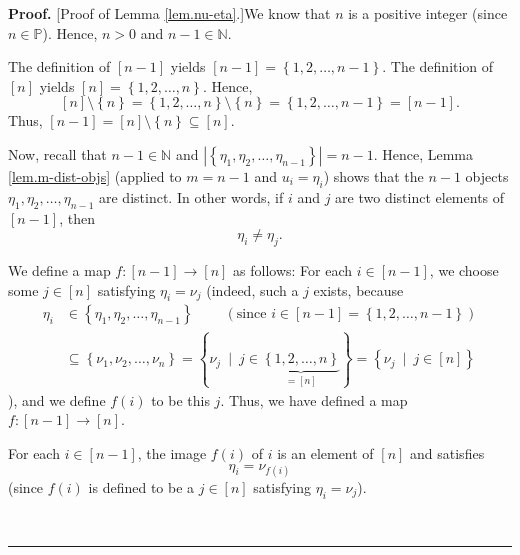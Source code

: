 \documentclass[numbers=enddot,12pt,final,onecolumn,notitlepage,english]{scrartcl}%
\theoremstyle{definition}
\newenvironment{proof}[1][Proof]{\noindent\textbf{#1.} }{\ \rule{0.5em}{0.5em}}
\newenvironment{verlong}{}{}
\begin{document}
\begin{verlong}
\begin{proof}
[Proof of Lemma \ref{lem.nu-eta}.]We know that $n$ is a positive integer
(since $n\in\mathbb{P}$). Hence, $n>0$ and $n-1\in\mathbb{N}$.

The definition of $\left[  n-1\right]  $ yields $\left[  n-1\right]  =\left\{
1,2,\ldots,n-1\right\}  $. The definition of $\left[  n\right]  $ yields
$\left[  n\right]  =\left\{  1,2,\ldots,n\right\}  $. Hence,%
\[
\left[  n\right]  \setminus\left\{  n\right\}  =\left\{  1,2,\ldots,n\right\}
\setminus\left\{  n\right\}  =\left\{  1,2,\ldots,n-1\right\}  =\left[
n-1\right]  .
\]
Thus, $\left[  n-1\right]  =\left[  n\right]  \setminus\left\{  n\right\}
\subseteq\left[  n\right]  $.

Now, recall that $n-1\in\mathbb{N}$ and $\left\vert \left\{  \eta_{1},\eta
_{2},\ldots,\eta_{n-1}\right\}  \right\vert =n-1$. Hence, Lemma
\ref{lem.m-dist-objs} (applied to $m=n-1$ and $u_{i}=\eta_{i}$) shows that the
$n-1$ objects $\eta_{1},\eta_{2},\ldots,\eta_{n-1}$ are distinct. In other
words, if $i$ and $j$ are two distinct elements of $\left[  n-1\right]  $,
then%
\begin{equation}
\eta_{i}\neq\eta_{j}. \label{pf.lem.nu-eta.etapneqetaq}%
\end{equation}


We define a map $f:\left[  n-1\right]  \rightarrow\left[  n\right]  $ as
follows: For each $i\in\left[  n-1\right]  $, we choose some $j\in\left[
n\right]  $ satisfying $\eta_{i}=\nu_{j}$ (indeed, such a $j$ exists, because
\begin{align*}
\eta_{i}  &  \in\left\{  \eta_{1},\eta_{2},\ldots,\eta_{n-1}\right\}
\ \ \ \ \ \ \ \ \ \ \left(  \text{since }i\in\left[  n-1\right]  =\left\{
1,2,\ldots,n-1\right\}  \right) \\
&  \subseteq\left\{  \nu_{1},\nu_{2},\ldots,\nu_{n}\right\}  =\left\{  \nu
_{j}\ \mid\ j\in\underbrace{\left\{  1,2,\ldots,n\right\}  }_{=\left[
n\right]  }\right\}  =\left\{  \nu_{j}\ \mid\ j\in\left[  n\right]  \right\}
\end{align*}
), and we define $f\left(  i\right)  $ to be this $j$. Thus, we have defined a
map $f:\left[  n-1\right]  \rightarrow\left[  n\right]  $.

For each $i\in\left[  n-1\right]  $, the image $f\left(  i\right)  $ of $i$ is
an element of $\left[  n\right]  $ and satisfies%
\begin{equation}
\eta_{i}=\nu_{f\left(  i\right)  } \label{pf.lem.nu-eta.def-f.2}%
\end{equation}
(since $f\left(  i\right)  $ is defined to be a $j\in\left[  n\right]  $
satisfying $\eta_{i}=\nu_{j}$).


\end{proof}
\end{verlong}
\end{document}
